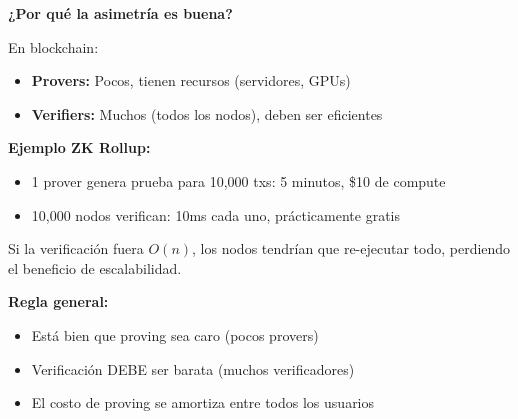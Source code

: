 \documentclass[11pt,a4paper,twoside,openright]{book}
\theoremstyle{definition}
\theoremstyle{plain}
\theoremstyle{remark}
\begin{document}
\begin{keyidea}
\textbf{¿Por qué la asimetría es buena?}

En blockchain:
\begin{itemize}
    \item \textbf{Provers:} Pocos, tienen recursos (servidores, GPUs)
    \item \textbf{Verifiers:} Muchos (todos los nodos), deben ser eficientes
\end{itemize}

\textbf{Ejemplo ZK Rollup:}
\begin{itemize}
    \item 1 prover genera prueba para 10,000 txs: 5 minutos, \$10 de compute
    \item 10,000 nodos verifican: 10ms cada uno, prácticamente gratis
\end{itemize}

Si la verificación fuera $O(n)$, los nodos tendrían que re-ejecutar todo, perdiendo el beneficio de escalabilidad.

\textbf{Regla general:}
\begin{itemize}
    \item Está bien que proving sea caro (pocos provers)
    \item Verificación DEBE ser barata (muchos verificadores)
    \item El costo de proving se amortiza entre todos los usuarios
\end{itemize}
\end{keyidea}
\end{document}
